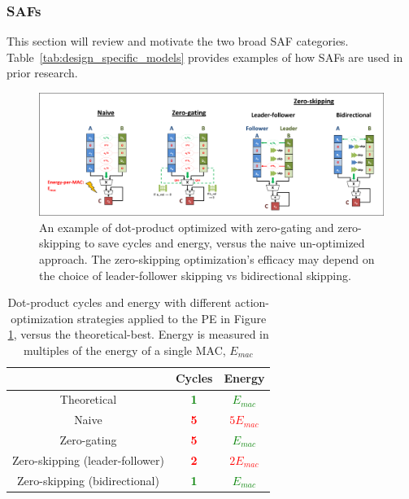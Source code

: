 %
%
\subsubsection{SAFs}
\label{background:safs}

This section will review and motivate the two broad SAF categories. Table~\ref{tab:design_specific_models} provides examples of how SAFs are used in prior research.

%
%
\begin{figure}[H]
\includegraphics[width=\textwidth]{figures/saf_action_optimizations.PNG}
\caption{An example of dot-product optimized with zero-gating and zero-skipping to save cycles and energy, versus the naive un-optimized approach. The zero-skipping optimization's efficacy may depend on the choice of leader-follower skipping vs bidirectional skipping.}
\label{fig:saf_action_optimizations}
\end{figure}
%
%
\begin{table}[ht]
\begin{tabular}{c|c|c|}
 & Cycles & Energy \\ \hline \hline
Theoretical &  \textcolor{green}{\textbf{1}} & \textcolor{green}{\textbf{$E_{mac}$}}\\ \hline
Naive &  \textcolor{red}{\textbf{5}} & \textcolor{red}{\textbf{$5 E_{mac}$}}\\ \hline
Zero-gating &  \textcolor{red}{\textbf{5}} & \textcolor{green}{\textbf{$E_{mac}$}} \\ \hline
Zero-skipping (leader-follower) & \textcolor{red}{\textbf{2}} & \textcolor{red}{\textbf{$2 E_{mac}$}} \\ \hline
Zero-skipping (bidirectional) & \textcolor{green}{\textbf{1}} & \textcolor{green}{\textbf{$E_{mac}$}} \\ \hline
\end{tabular}
\caption{Dot-product cycles and energy with different action-optimization strategies applied to the PE in Figure \ref{fig:saf_action_optimizations}, versus the theoretical-best. Energy is measured in multiples of the energy of a single MAC, $E_{mac}$}
\label{tab:action_saf_comparison}
\centering
\end{table}
%
%
